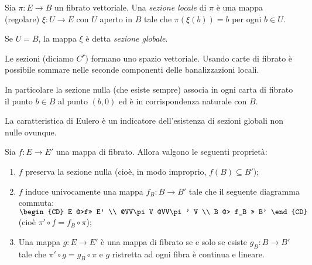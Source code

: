 \begin{definition}  
	Sia $\pi:E\to B$ un fibrato vettoriale. Una \emph{sezione locale} di $\pi$ è una mappa (regolare) $\xi:U \to E$ con $U$ aperto in $B$ tale che $\pi(\xi(b)) = b$ per ogni $b\in U$.
	
	Se $U = B$, la mappa $\xi$ è detta \emph{sezione globale}.
\end{definition}

\begin{remark}
	Le sezioni (diciamo $C^r$) formano uno spazio vettoriale. Usando carte di fibrato è possibile sommare nelle seconde componenti delle banalizzazioni locali.
	
	In particolare la sezione nulla (che esiste sempre) associa in ogni carta di fibrato il punto $b\in B$ al punto $(b,0)$ ed è in corrispondenza naturale con $B$.
	
	La caratteristica di Eulero è un indicatore dell'esistenza di sezioni globali non nulle ovunque.
\end{remark}

\begin{proposition}
	Sia $f:E \to E'$ una mappa di fibrato. Allora valgono le seguenti proprietà:
	\begin{enumerate}
	 \item $f$ preserva la sezione nulla (cioè, in modo improprio, $f(B)\subseteq B'$);
	 \item $f$ induce univocamente una mappa $f_B:B \to B'$ tale che il seguente diagramma commuta: 
	 $\begin{CD}
	 	E	@>f>>	E' \\
	 	@VV\pi V	@VV\pi' V \\
	 	B	@> f_B >> B'
	 \end{CD}\ \ $ %
	 (cioè $\pi'\circ f = f_B \circ \pi$);
	 \item Una mappa $g: E \to E'$ è una mappa di fibrato se e solo se esiste $g_B:B \to B'$ tale che $\pi'\circ g = g_B\circ \pi$ e $g$ ristretta ad ogni fibra è continua e lineare.
	\end{enumerate}
\end{proposition}



